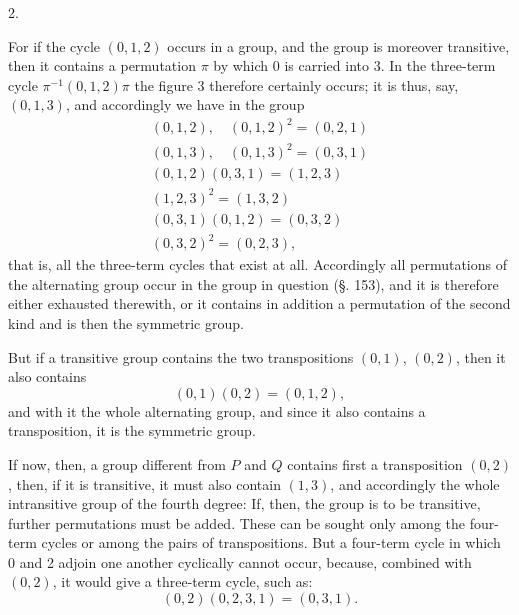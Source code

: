 
2. 

For if the cycle $(0,1,2)$ occurs in a group, and the group is moreover transitive, then it contains a permutation $\pi$ by which 0 is carried into 3. In the three-term cycle $\pi^{-1}(0,1,2)\pi$ the figure 3 therefore certainly occurs; it is thus, say, $(0,1,3)$, and accordingly we have in the group
\[
\begin{gathered}
(0,1,2), \quad (0,1,2)^2 = (0,2,1) \\
(0,1,3), \quad (0,1,3)^2 = (0,3,1) \\
(0,1,2)(0,3,1) = (1,2,3) \\
(1,2,3)^2 = (1,3,2) \\
(0,3,1)(0,1,2) = (0,3,2) \\
(0,3,2)^2 = (0,2,3),
\end{gathered}
\]
that is, all the three-term cycles that exist at all. Accordingly all permutations of the alternating group occur in the group in question (§. 153), and it is therefore either exhausted therewith, or it contains in addition a permutation of the second kind and is then the symmetric group.

But if a transitive group contains the two transpositions $(0,1)$, $(0,2)$, then it also contains
\[
(0,1)(0,2) = (0,1,2),
\]
and with it the whole alternating group, and since it also contains a transposition, it is the symmetric group.

If now, then, a group different from $P$ and $Q$ contains first a transposition $(0,2)$, then, if it is transitive, it must also contain $(1,3)$, and accordingly the whole intransitive group of the fourth degree:
If, then, the group is to be transitive, further permutations must be added. These can be sought only among the four-term cycles or among the pairs of transpositions. But a four-term cycle in which 0 and 2 adjoin one another cyclically cannot occur, because, combined with $(0,2)$, it would give a three-term cycle, such as:
\[
(0,2)(0,2,3,1) = (0,3,1).
\]
